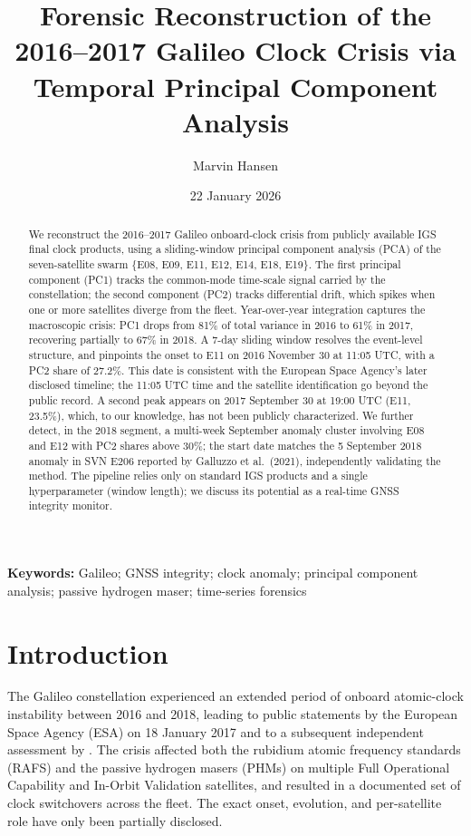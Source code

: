 \documentclass[11pt,a4paper]{article}
\title{Forensic Reconstruction of the 2016--2017 Galileo Clock Crisis via Temporal Principal Component Analysis}
\author[1]{Marvin Hansen}
\affil[1]{The Center for Dynamic Causality, \texttt{marvin.hansen@causalcenter.com}}
\date{22 January 2026}
\begin{document}
\maketitle

\begin{abstract}
\noindent
We reconstruct the 2016--2017 Galileo onboard-clock crisis from publicly available IGS final clock products, using a sliding-window principal component analysis (PCA) of the seven-satellite swarm \{E08, E09, E11, E12, E14, E18, E19\}. The first principal component (PC1) tracks the common-mode time-scale signal carried by the constellation; the second component (PC2) tracks differential drift, which spikes when one or more satellites diverge from the fleet. Year-over-year integration captures the macroscopic crisis: PC1 drops from 81\% of total variance in 2016 to 61\% in 2017, recovering partially to 67\% in 2018. A 7-day sliding window resolves the event-level structure, and pinpoints the onset to E11 on 2016 November 30 at 11:05 UTC, with a PC2 share of 27.2\%. This date is consistent with the European Space Agency's later disclosed timeline; the 11:05 UTC time and the satellite identification go beyond the public record. A second peak appears on 2017 September 30 at 19:00 UTC (E11, 23.5\%), which, to our knowledge, has not been publicly characterized. We further detect, in the 2018 segment, a multi-week September anomaly cluster involving E08 and E12 with PC2 shares above 30\%; the start date matches the 5 September 2018 anomaly in SVN E206 reported by Galluzzo et al.\ (2021), independently validating the method. The pipeline relies only on standard IGS products and a single hyperparameter (window length); we discuss its potential as a real-time GNSS integrity monitor.
\end{abstract}

\noindent\textbf{Keywords:} Galileo; GNSS integrity; clock anomaly; principal component analysis; passive hydrogen maser; time-series forensics

\section{Introduction}

The Galileo constellation experienced an extended period of onboard atomic-clock instability between 2016 and 2018, leading to public statements by the European Space Agency (ESA) on 18 January 2017 \citep{ESA2017} and to a subsequent independent assessment by \citet{Galluzzo2021}. The crisis affected both the rubidium atomic frequency standards (RAFS) and the passive hydrogen masers (PHMs) on multiple Full Operational Capability and In-Orbit Validation satellites, and resulted in a documented set of clock switchovers across the fleet. The exact onset, evolution, and per-satellite role have only been partially disclosed.
\end{document}
